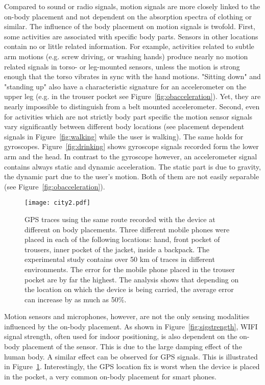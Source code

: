 Compared
to sound or radio signals, motion signals are more closely linked to the on-body
placement and not dependent on the absorption spectra of clothing or similar. The
influence of the body placement on motion signals is twofold. First,
some activities are associated with specific body parts. Sensors in
other locations contain no or little related information. For example,
activities related to subtle arm motions (e.g. screw driving, or
washing hands) produce nearly no motion related signals in torso- or
leg-mounted sensors, unless the motion is strong enough that the torso
vibrates in sync with the hand motions. "Sitting down" and "standing
up" also have a characteristic signature for an accelerometer on the
upper leg (e.g. in the trouser pocket see Figure~\ref{fig:obacceleration}). Yet, they are nearly
impossible to distinguish from a belt mounted accelerometer. Second,
even for activities which are not strictly body part specific the
motion sensor signals vary significantly between different body
locations (see placement dependent signals in Figure~\ref{fig:walking} while the user is walking).
The same holds for gyroscopes. Figure~\ref{fig:drinking} shows gyroscope signals recorded form the lower arm and the head. 
In contrast to the gyroscope however,  an accelerometer signal contains always static and dynamic acceleration.
The static part is due to gravity, the dynamic part due to the user's motion. Both of them are not easily separable (see Figure~\ref{fig:obacceleration}).

\begin{figure}[t]
    \begin{center}
    \texttt{[image: city2.pdf]}
	\end{center}
\caption[Body placement impact on GPS]{GPS traces using the same route
recorded with the device at different on body placements.
Three different mobile phones were placed in
each of the following locations: hand, front pocket of trousers, inner
pocket of the jacket, inside a backpack. The experimental study
contains over 50 km of traces in different environments. The error for the mobile phone placed in the
trouser pocket are by far the highest.  The analysis shows that
depending on the location on which the device is being carried, the
average error can increase by as much as 50\%. }  
\label{fig:gps} 
\end{figure}

Motion sensors and microphones, however, are not the only sensing modalities
influenced by the on-body placement. As shown in
Figure~\ref{fig:sigstrength}, WIFI signal strength, often used for
indoor positioning, is also dependent on the on-body placement of the sensor. This is
due to the large damping effect of the human body.  A similar effect
can be observed for GPS signals. This is illustrated in
Figure~\ref{fig:gps}. Interestingly, the GPS location fix is worst when the device is placed in the pocket,
a very common on-body placement for smart phones.

